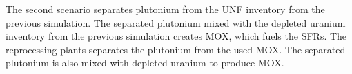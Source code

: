 The second scenario separates plutonium from the \gls{UNF}
inventory from the previous simulation. The separated
plutonium mixed with the depleted uranium inventory from the previous simulation
creates \gls{MOX}, which fuels the \gls{SFR}s. The reprocessing plants
separates the plutonium from the used \gls{MOX}. The separated plutonium is also
mixed with depleted uranium to produce \gls{MOX}.
